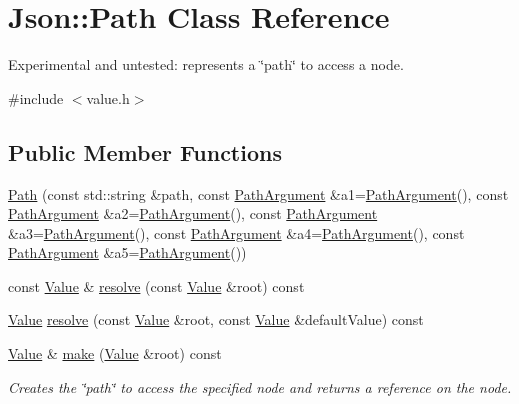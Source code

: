 \hypertarget{classJson_1_1Path}{\section{Json\-:\-:Path Class Reference}
\label{dc/d4c/classJson_1_1Path}
}


Experimental and untested\-: represents a \char`\"{}path\char`\"{} to access a node.  




{\ttfamily \#include $<$value.\-h$>$}

\subsection*{Public Member Functions}
\begin{DoxyCompactItemize}
\item 
\hyperlink{classJson_1_1Path_aaa37a99650e770d0cd680bf53585ec99}{Path} (const std\-::string \&path, const \hyperlink{classJson_1_1PathArgument}{Path\-Argument} \&a1=\hyperlink{classJson_1_1PathArgument}{Path\-Argument}(), const \hyperlink{classJson_1_1PathArgument}{Path\-Argument} \&a2=\hyperlink{classJson_1_1PathArgument}{Path\-Argument}(), const \hyperlink{classJson_1_1PathArgument}{Path\-Argument} \&a3=\hyperlink{classJson_1_1PathArgument}{Path\-Argument}(), const \hyperlink{classJson_1_1PathArgument}{Path\-Argument} \&a4=\hyperlink{classJson_1_1PathArgument}{Path\-Argument}(), const \hyperlink{classJson_1_1PathArgument}{Path\-Argument} \&a5=\hyperlink{classJson_1_1PathArgument}{Path\-Argument}())
\item 
const \hyperlink{classJson_1_1Value}{Value} \& \hyperlink{classJson_1_1Path_a781d60b27fdb34f228018e5b1ce16d59}{resolve} (const \hyperlink{classJson_1_1Value}{Value} \&root) const 
\item 
\hyperlink{classJson_1_1Value}{Value} \hyperlink{classJson_1_1Path_a33d1749770a4cf74e9a3de419bc7febe}{resolve} (const \hyperlink{classJson_1_1Value}{Value} \&root, const \hyperlink{classJson_1_1Value}{Value} \&default\-Value) const 
\item 
\hyperlink{classJson_1_1Value}{Value} \& \hyperlink{classJson_1_1Path_afa04fe0c53033fdc044bc7e3c782c4af}{make} (\hyperlink{classJson_1_1Value}{Value} \&root) const 
\begin{DoxyCompactList}\small\item\em Creates the \char`\"{}path\char`\"{} to access the specified node and returns a reference on the node. \end{DoxyCompactList}\item 

\end{DoxyCompactItemize}
